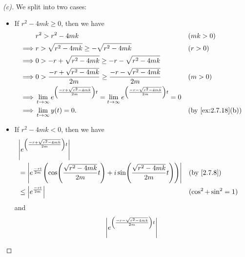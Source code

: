 \begin{proof}[(c)]
  We split into two cases:
  \begin{itemize}
    \item If \(r^2 - 4mk \geq 0\), then we have
          \begin{align*}
                     & r^2 > r^2 - 4mk                                                                                                                       &  & (mk > 0)          \\
            \implies & r > \sqrt{r^2 - 4mk} \geq -\sqrt{r^2 - 4mk}                                                                                           &  & (r > 0)           \\
            \implies & 0 > -r + \sqrt{r^2 - 4mk} \geq -r - \sqrt{r^2 - 4mk}                                                                                                         \\
            \implies & 0 > \frac{-r + \sqrt{r^2 - 4mk}}{2m} \geq \frac{-r - \sqrt{r^2 - 4mk}}{2m}                                                            &  & (m > 0)           \\
            \implies & \Lim_{t \to \infty} e^{\pa{\frac{-r + \sqrt{r^2 - 4mk}}{2m}} t} = \Lim_{t \to \infty} e^{\pa{\frac{-r - \sqrt{r^2 - 4mk}}{2m}} t} = 0                        \\
            \implies & \Lim_{t \to \infty} y(t) = 0.                                                                                                         &  & \by{ex:2.7.18}[b]
          \end{align*}
    \item If \(r^2 - 4mk < 0\), then we have
          \begin{align*}
             & \abs{e^{\pa{\frac{-r + \sqrt{r^2 - 4mk}}{2m}} t}}                                                                                            \\
             & = \abs{e^{\frac{-rt}{2m}} \pa{\cos\pa{\frac{\sqrt{r^2 - 4mk}}{2m} t} + i \sin\pa{\frac{\sqrt{r^2 - 4mk}}{2m} t}}} &  & \by{2.7.8}            \\
             & \leq \abs{e^{\frac{-rt}{2m}}}                                                                                     &  & (\cos^2 + \sin^2 = 1)
          \end{align*}
          and
          \begin{align*}
             & \abs{e^{\pa{\frac{-r - \sqrt{r^2 - 4mk}}{2m}} t}}                                                                                              \\

\end{align*}
\end{itemize}
\end{proof}
